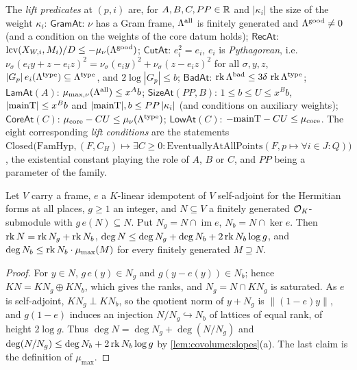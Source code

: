 \begin{definition}\label{def:covolume:predicates}
The \emph{lift predicates} at $(p,i)$ are, for $A,B,C,PP\in\mathbb{R}$ and $|\kappa_i|$ the size of the weight
$\kappa_i$:
$\mathsf{GramAt}$: $\nu$ has a Gram frame, $\Lambda^{\mathrm{all}}$ is finitely generated and
$\Lambda^{\mathrm{good}}\ne0$ (and a condition on the weights of the core datum holds);
$\mathsf{RecAt}$: $\operatorname{lcv}(X_{W,i},M_i)/D\le-\mu_\nu(\Lambda^{\mathrm{good}})$;
$\mathsf{CutAt}$: $e_i^2=e_i$, $e_i$ is \emph{Pythagorean}, i.e.\
$\nu_\sigma(e_iy+z-e_iz)^2=\nu_\sigma(e_iy)^2+\nu_\sigma(z-e_iz)^2$ for all $\sigma,y,z$,
$|G_p|\,e_i(\Lambda^{\mathrm{type}})\subseteq\Lambda^{\mathrm{type}}$, and $2\log|G_p|\le b$;
$\mathsf{BadAt}$: $\operatorname{rk}\Lambda^{\mathrm{bad}}\le3\delta\,\operatorname{rk}\Lambda^{\mathrm{type}}$;
$\mathsf{LamAt}(A)$: $\mu_{\max,\nu}(\Lambda^{\mathrm{all}})\le x^Ab$;
$\mathsf{SizeAt}(PP,B)$: $1\le b\le U\le x^Bb$, $|\mathrm{mainT}|\le x^Bb$ and
$|\mathrm{mainT}|,b\le PP\,|\kappa_i|$ (and conditions on auxiliary weights);
$\mathsf{CoreAt}(C)$: $\mu_{\mathrm{core}}-CU\le\mu_\nu(\Lambda^{\mathrm{type}})$;
$\mathsf{LowAt}(C)$: $-\mathrm{mainT}-CU\le\mu_{\mathrm{core}}$.
The eight corresponding \emph{lift conditions} are the statements
$\mathrm{Closed}\bigl(\mathrm{FamHyp},(F,C_H)\mapsto\exists C\ge0:\mathrm{EventuallyAtAllPoints}(F,p\mapsto\forall i\in J:Q)\bigr)$,
the existential constant playing the role of $A$, $B$ or $C$, and $PP$ being a parameter of the family.
\end{definition}

\begin{lemma}\label{lem:covolume:goodbad}
Let $V$ carry a frame, $e$ a $K$-linear idempotent of $V$ self-adjoint for the Hermitian forms at all
places, $g\ge1$ an integer, and $N\subseteq V$ a finitely generated $\mathcal{O}_K$-submodule with
$g\,e(N)\subseteq N$. Put $N_g=N\cap\operatorname{im}e$, $N_b=N\cap\ker e$. Then
$\operatorname{rk} N=\operatorname{rk} N_g+\operatorname{rk} N_b$, $\deg N\le\deg N_g+\deg N_b+2\operatorname{rk} N_b\log g$, and
$\deg N_b\le\operatorname{rk} N_b\cdot\mu_{\max}(M)$ for every finitely generated $M\supseteq N$.
\end{lemma}

\begin{proof}
For $y\in N$, $g\,e(y)\in N_g$ and $g(y-e(y))\in N_b$; hence $KN=KN_g\oplus KN_b$, which gives the
ranks, and $N_g=N\cap KN_g$ is saturated. As $e$ is self-adjoint, $KN_g\perp KN_b$, so the quotient norm
of $y+N_g$ is $\|(1-e)y\|$, and $g(1-e)$ induces an injection $N/N_g\hookrightarrow N_b$ of lattices of
equal rank, of height $2\log g$. Thus $\deg N=\deg N_g+\deg(N/N_g)$ and
$\deg(N/N_g)\le\deg N_b+2\operatorname{rk} N_b\log g$ by \cref{lem:covolume:slopes}(a). The last claim is the
definition of $\mu_{\max}$.
\end{proof}

